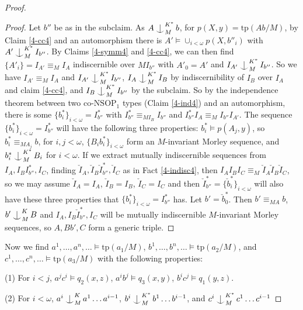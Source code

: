 \documentclass[12pt]{amsart}
\theoremstyle{definition}
\def\Ind#1#2{#1\setbox0=\hbox{$#1x$}\kern\wd0\hbox to 0pt{\hss$#1\mid$\hss}
\lower.9\ht0\hbox to 0pt{\hss$#1\smile$\hss}\kern\wd0}
\def\ind{\mathop{\mathpalette\Ind{}}}
\begin{document}
\begin{proof}
\begin{proof}
    Let $b''$ be as in the subclaim. As $A \ind^{K^{*}}_{M} b$, for $p(X, y) = \mathrm{tp}(Ab/ M)$, by Claim \ref{4-cc4} and an automorphism there is $A' \models \cup_{i < \omega} p(X, b''_{i})$ with $A' \ind^{K^{*}}_{M} I_{b''}$. By Claims \ref{4-symm4} and \ref{4-cc4}, we can then find $\{A'_{i}\}=I_{A'} \equiv_{M} I_{A}$ indiscernible over $MI_{b''}$ with $A'_{0}=A'$ and $I_{A'} \ind^{K^{*}}_{M} I_{b''}$. So we have $I_{A'} \equiv_{M} I_{A}$ and $I_{A'} \ind^{K^{*}}_{M} I_{b''}$, $I_{A} \ind^{K^{*}}_{M} I_{B}$ by indiscernibility of $I_{B}$ over $I_{A}$ and claim \ref{4-cc4}, and $I_{B} \ind^{K^{*}}_{M} I_{b''}$ by the subclaim. So by the independence theorem between two co-$\mathrm{NSOP}_{1}$ types (Claim \ref{4-ind4}) and an automorphism, there is some $\{b^{*}_{i}\}_{i < \omega}=I^{*}_{b''}$ with $ I^{*}_{b''} \equiv_{MI_{B}} I_{b''}$ and $I^{*}_{b''} I_{A} \equiv_{M} I_{b''} I_{A'}$. The sequence $\{b^{*}_{i}\}_{i < \omega}=I^{*}_{b''}$ will have the following three properties: $b^{*}_{i} \models p(A_{j}, y)$, so $b^{*}_{i} \equiv_{MA_{j}} b$, for $i, j < \omega$, $\{B_{i}b^{*}_{i}\}_{i < \omega}$ form an $M$-invariant Morley sequence, and $b^{*}_{i} \ind_{M}^{K^{*}} B_{i}$ for $i < \omega$. If we extract mutually indiscernible  sequences from $I_{A}, I_{B}I^{*}_{b''}, I_{C}$, finding $\check{I}_{A}, \check{I}_{B}\check{I}^{*}_{b''}, \check{I}_{C}$ as in Fact \ref{4-indisc4}, then $I_{A} I_{B} I_{C} \equiv_{M} \check{I}_{A} \check{I}_{B} \check{I}_{C}$, so we may assume $\check{I}_{A} = I_{A}$, $\check{I}_{B} = I_{B}$, $\check{I}_{C} = I_{C}$ and then $\check{I}^{*}_{b''}=\{\check{b}_{i}^{*}\}_{i < \omega}$ will also have these three properties that $\{b^{*}_{i}\}_{i < \omega}=I^{*}_{b''}$ has. Let $b' =\check{b}_{0}^{*}$. Then $b'  \equiv_{MA} b$, $b' \ind_{M}^{K} B$ and $I_{A}, I_{B}\check{I}^{*}_{b''}, I_{C}$ will be mutually indiscernible $M$-invariant Morley sequences, so $A, Bb', C$ form a generic triple.  
\end{proof}


Now we find $a^{1}, \ldots, a^{n}, \ldots \models \mathrm{tp}(a_{1}/M)$, $b^{1}, \ldots, b^{n}, \ldots \models \mathrm{tp}(a_{2}/M)$, and $c^{1}, \ldots, c^{n}, \ldots \models \mathrm{tp}(a_{3}/M)$ with the following properties:

(1) For $i < j$, $a^{j}c^{i} \models q_{2}(x, z)$, $a^{i}b^{j} \models q_{3}(x, y)$, $b^{i}c^{j} \models q_{1}(y, z)$.

(2) For $i < \omega$, $a^{i} \ind^{K}_{M} a^{1} \ldots a^{i-1}$, $b^{i} \ind^{K^{*}}_{M} b^{1} \ldots b^{i-1}$, and $c^{i} \ind^{K^{{*}}}_{M} c^{1} \ldots c^{i-1}$


\end{proof}
\end{document}
